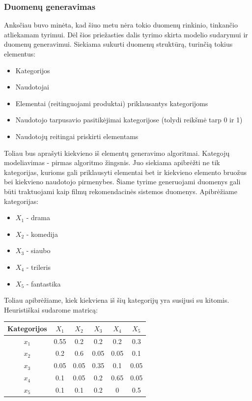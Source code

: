 \documentclass{VUMIFInfMagistrinis}
\begin{document}
\subsubsection{Duomenų generavimas}
\indent
Anksčiau buvo minėta, kad šiuo metu nėra tokio duomenų rinkinio, tinkančio atliekamam tyrimui. Dėl šios priežasties dalis tyrimo skirta modelio sudarymui ir duomenų generavimui. Siekiama sukurti duomenų struktūrą, turinčią tokius elementus:
\begin{itemize}
	\item Kategorijos
	\item Naudotojai
	\item Elementai (reitinguojami produktai) priklausantys kategorijoms
	\item Naudotojo tarpusavio pasitikėjimai kategorijose (tolydi reikšmė tarp 0 ir 1)
	\item Naudotojų reitingai priskirti elementams
\end{itemize}
Toliau bus aprašyti kiekvieno iš elementų generavimo algoritmai.
Kategojų modeliavimas - pirmas algoritmo žingsnis. Juo siekiama apibrėžti ne tik kategorijas, kurioms gali priklausyti elementai bet ir kiekvieno elemento bruožus bei kiekvieno naudotojo pirmenybes. Šiame tyrime generuojami duomenys gali būti traktuojami kaip filmų rekomendacinės sistemos duomenys. Apibrėžiame kategorijas:
\begin{itemize}
	\item $X_1$ - drama
	\item $X_2$ - komedija
	\item $X_3$ - siaubo
	\item $X_4$ - trileris
	\item $X_5$ - fantastika
\end{itemize}
Toliau apibrėžiame, kiek kiekviena iš šių kategorijų yra susijusi su kitomis. Heuristiškai sudarome matricą:
\begin{center}
	\begin{tabular}{||c c c c c c||} 
		\hline
		Kategorijos & $X_1$ & $X_2$ & $X_3$ & $X_4$ & $X_5$ \\ [0.5ex] 
		\hline\hline
		$x_1$ & 0.55 & 0.2 & 0.2 & 0.2 & 0.3 \\ 
		\hline
		$x_2$ & 0.2 & 0.6 & 0.05 & 0.05 & 0.1 \\
		\hline
		$x_3$ & 0.05 & 0.05 & 0.35 & 0.1 & 0.05 \\
		\hline
		$x_4$ & 0.1 & 0.05 & 0.2 & 0.65 & 0.05 \\
		\hline
		$x_5$ & 0.1 & 0.1 & 0.2 & 0 & 0.5 \\ [1ex] 
		\hline
	\end{tabular}
\end{center}
\end{document}
